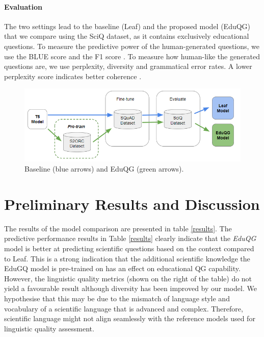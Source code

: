 \documentclass[letterpaper]{article} %
\begin{document}
\paragraph{Evaluation}
The two settings lead to the baseline (Leaf) and the proposed model (EduQG) that we compare using the SciQ dataset, as it contains exclusively educational questions.
To measure the predictive power of the human-generated questions, we use the BLUE score and the F1 score \cite{DBLP:rajpurkar2016squad}. To measure how human-like the generated questions are, we use perplexity, diversity and grammatical error rates. A lower perplexity score indicates better coherence \cite{wang2022towards}.
\begin{figure}[]
    \centering
    \includegraphics[width=\columnwidth]{methodology_new_v2.png}
    \caption{Baseline (blue arrows) and EduQG (green arrows).}
    \label{fig:method}
\end{figure}

\section{Preliminary Results and Discussion}

The results of the model comparison are presented in table \ref{results}.
The predictive performance results in Table \ref{results} clearly indicate that the \textit{EduQG} model is better at predicting scientific questions based on the context compared to Leaf. This is a strong indication that the additional scientific knowledge the EduGQ model is pre-trained on has an effect on educational QG capability. However, the linguistic quality metrics (shown on the right of the table) do not yield a favourable result although diversity has been improved by our model. We hypothesise that this may be due to the mismatch of language style and vocabulary of a scientific language that is advanced and complex. Therefore, scientific language might not align seamlessly with the reference models used for linguistic quality assessment.
\end{document}
